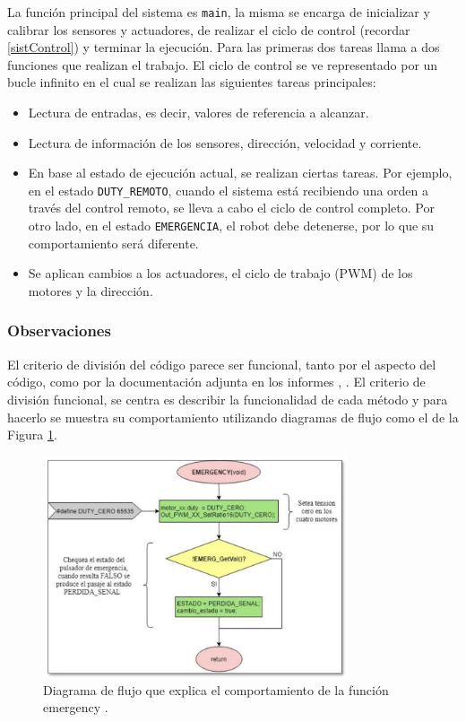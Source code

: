 La función principal del sistema es \verb|main|, la misma se encarga de inicializar y calibrar los sensores y actuadores, de realizar el ciclo de control (recordar \ref{sistControl}) y terminar la ejecución. Para las primeras dos tareas llama a dos funciones que realizan el trabajo. El ciclo de control se ve representado por un bucle infinito en el cual se realizan las siguientes tareas principales:
\begin{itemize}
\item Lectura de entradas, es decir, valores de referencia a alcanzar.
\item Lectura de información de los sensores, dirección, velocidad y corriente.
\item En base al estado de ejecución actual, se realizan ciertas tareas. Por ejemplo, en el estado \verb|DUTY_REMOTO|, cuando el sistema está recibiendo una orden a través del control remoto, se lleva a cabo el ciclo de control completo. Por otro lado, en el estado \verb|EMERGENCIA|, el robot debe detenerse, por lo que su comportamiento será diferente.
\item Se aplican cambios a los actuadores, el ciclo de trabajo (\gls{PWM}) de los motores y la dirección.
\end{itemize}

\subsubsection*{Observaciones}
El criterio de división del código parece ser funcional, tanto por el aspecto del código, como por la documentación adjunta en los informes \cite[pág. 78-85]{disenioViejo1}, \cite[pág. 110-149]{disenioViejo2}. El criterio de división funcional, se centra es describir la funcionalidad de cada método y para hacerlo se muestra su comportamiento utilizando diagramas de flujo como el de la Figura \ref{diagra}. 

\begin{figure}[h]
\caption{Diagrama de flujo que explica el comportamiento de la función emergency \cite[pág. 82]{disenioViejo1}.}
\label{diagra}
\begin{centering}
{\includegraphics[width=0.8\textwidth]{diagramaFlujo.png}\par}
\end{centering}
\end{figure}


